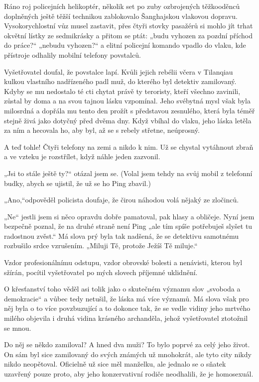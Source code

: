 Ráno roj policejních helikoptér, několik set po zuby ozbrojených těžkooděnců doplněných ještě těžší technikou zablokovalo Šanghajskou vlakovou dopravu. Vysokorychlostní vůz musel zastavit, přes čtyři stovky pasažérů si mohlo jít trhat okvětní lístky ze sedmikrásky a přitom se ptát: „budu vyhozen za pozdní příchod do práce?“ „nebudu vyhozen?“ a elitní policejní komando vpadlo do vlaku, kde přístroje odhalily mobilní telefony povstalců.

Vyšetřovatel doufal, že povstalce lapí. Kvůli jejich rebélii včera v Tilanqiau kulkou vlastního nadřízeného padl muž, do kterého byl detektiv zamilovaný. Kdyby se mu nedostalo té cti chytat právě ty teroristy, kteří všechno zavinili, zůstal by doma a na svou tajnou lásku vzpomínal. Jeho svébytná mysl však byla milosrdná a dopřála mu tento den prožít s představou zesnulého, která byla téměř stejně živá jako dotyčný před dvěma dny. Když vbíhal do vlaku, jeho láska letěla za ním a hecovala ho, aby byl, až se s rebely střetne, neúprosný.

A teď tohle! Čtyři telefony na zemi a nikdo k nim. Už se chystal vytáhnout zbraň a ve vzteku je rozstřílet, když náhle jeden zazvonil.

„Jsi to stále ještě ty?“ otázal jsem se. (Volal jsem tehdy na svůj mobil z telefonní budky, abych se ujistil, že už se ho Ping zbavil.)

„Ano,“odpověděl policista doufaje, že čirou náhodou volá nějaký ze zločinců.

„Ne“ jestli jsem si něco opravdu dobře pamatoval, pak hlasy a obličeje. Nyní jsem bezpečně poznal, že na druhé straně není Ping „ale tím spíše potřebuješ slyšet tu radostnou zvěst.“ Má slova prý byla tak nadšená, že se detektivu samotnému rozbušilo srdce vzrušením. „Miluji Tě, protože Ježíš Tě miluje.“

Vzdor profesionálnímu odstupu, vzdor obrovské bolesti a nenávisti, kterou byl sžírán, pocítil vyšetřovatel po mých slovech příjemné uklidnění.

O křesťanství toho věděl asi tolik jako o skutečném významu slov „svoboda a demokracie“ a vůbec tedy netušil, že láska má více významů.  Má slova však pro něj byla o to více povzbuzující a to dokonce tak, že se vedle vidiny jeho mrtvého milého objevila i druhá vidina krásného archanděla, jehož vyšetřovatel ztotožnil se mnou.

Do něj se někdo zamiloval? A hned dva muži? To bylo poprvé za celý jeho život. On sám byl sice zamilovaný do svých známých už mnohokrát, ale tyto city nikdy nikdo neopětoval. Oficielně už sice měl manželku, ale jednalo se o sňatek uzavřený pouze proto, aby jeho konzervativní rodiče neodhalili, že je homosexuál. 

